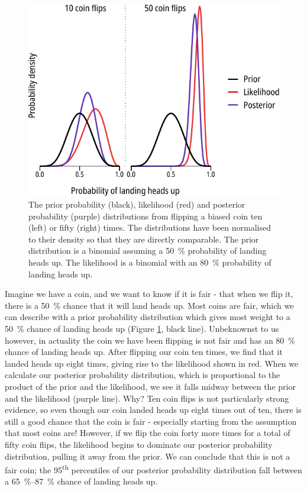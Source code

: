 \begin{figure}
	\centering
	\includegraphics[width=\textwidth]{coinflip_bayes.pdf}
	\caption[Flipping a coin - illustrating Bayesian analysis]{
		The prior probability (black), likelihood (red) and posterior probability (purple) distributions from flipping a biased coin ten (left) or fifty (right) times.
		The distributions have been normalised to their density so that they are directly comparable.
		The prior distribution is a binomial assuming a \SI{50}{\percent} probability of landing heads up.
		The likelihood is a binomial with an \SI{80}{\percent} probability of landing heads up.
	}\label{ch2fig:coinflip}
\end{figure}

Imagine we have a coin, and we want to know if it is fair - that when we flip it, there is a \SI{50}{\percent} chance that it will land heads up.
Most coins are fair, which we can describe with a prior probability distribution which gives most weight to a \SI{50}{\percent} chance of landing heads up (Figure \ref{ch2fig:coinflip}, black line).
Unbeknownst to us however, in actuality the coin we have been flipping is not fair and has an \SI{80}{\percent} chance of landing heads up.
After flipping our coin ten times, we find that it landed heads up eight times, giving rise to the likelihood shown in red.
When we calculate our posterior probability distribution, which is proportional to the product of the prior and the likelihood, we see it falls midway between the prior and the likelihood (purple line).
Why?
Ten coin flips is not particularly strong evidence, so even though our coin landed heads up eight times out of ten, there is still a good chance that the coin is fair - especially starting from the assumption that most coins are!
However, if we flip the coin forty more times for a total of fifty coin flips, the likelihood begins to dominate our posterior probability distribution, pulling it away from the prior.
We can conclude that this is not a fair coin; the 95\textsuperscript{th} percentiles of our posterior probability distribution fall between a \SIrange{65}{87}{\percent} chance of landing heads up.

